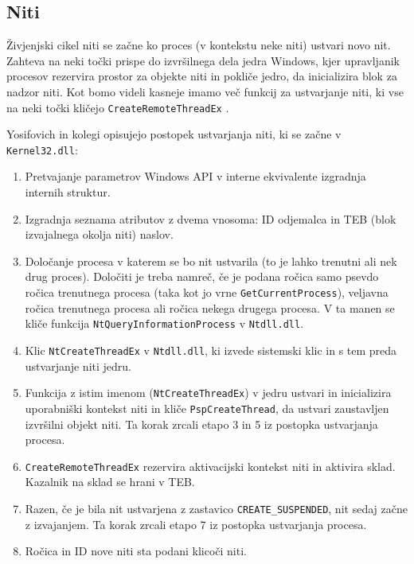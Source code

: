 \documentclass[a4paper,12pt,openright]{book}
\begin{document}
\subsection{Niti}

Živjenjski cikel niti se začne ko proces (v kontekstu neke niti) ustvari novo nit.
Zahteva na neki točki prispe do izvršilnega dela jedra Windows, kjer upravljanik procesov rezervira prostor za objekte niti in pokliče jedro, da inicializira blok za nadzor niti.
Kot bomo videli kasneje imamo več funkcij za ustvarjanje niti, ki vse na neki točki kličejo \texttt{CreateRemoteThreadEx} \cite{Yosifovich_Russinovich_Solomon_Ionescu_2017}.

Yosifovich in kolegi \cite{Yosifovich_Russinovich_Solomon_Ionescu_2017} opisujejo postopek ustvarjanja niti, ki se začne v \texttt{Kernel32.dll}:
\begin{enumerate}
	\item Pretvajanje parametrov Windows API v interne ekvivalente izgradnja internih struktur.
	\item Izgradnja seznama atributov z dvema vnosoma: ID odjemalca in TEB (blok izvajalnega okolja niti) naslov.
	\item Določanje procesa v katerem se bo nit ustvarila (to je lahko trenutni ali nek drug proces). 
	      Določiti je treba namreč, če je podana ročica samo psevdo ročica trenutnega procesa (taka kot jo vrne \texttt{GetCurrentProcess}), veljavna ročica trenutnega procesa ali ročica nekega drugega procesa.
	      V ta manen se kliče funkcija \texttt{NtQueryInformationProcess} v \texttt{Ntdll.dll}.
	\item Klic \texttt{NtCreateThreadEx} v \texttt{Ntdll.dll}, ki izvede sistemski klic in s tem preda ustvarjanje niti jedru.
	\item Funkcija z istim imenom (\texttt{NtCreateThreadEx}) v jedru ustvari in inicializira uporabniški kontekst niti in kliče \texttt{PspCreateThread}, da ustvari zaustavljen izvršilni objekt niti.
	      Ta korak zrcali etapo 3 in 5 iz postopka ustvarjanja procesa.
	\item \texttt{CreateRemoteThreadEx} rezervira aktivacijski kontekst niti in aktivira sklad.
	      Kazalnik na sklad se hrani v TEB.
	\item Razen, če je bila nit ustvarjena z zastavico \texttt{CREATE\_SUSPENDED}, nit sedaj začne z izvajanjem.
	      Ta korak zrcali etapo 7 iz postopka ustvarjanja procesa.
	\item Ročica in ID nove niti sta podani klicoči niti.
\end{enumerate}
\end{document}
